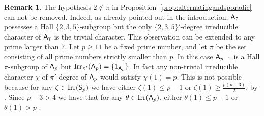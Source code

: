 \documentclass[12pt]{amsart}
\theoremstyle{definition}
\newtheorem{remark}[theorem]{Remark}
\numberwithin{equation}{section}
\newcommand{\Al}{\textup{\textsf{A}}}
\newcommand{\Sy}{\textup{\textsf{S}}}
\begin{document}
\begin{remark}
The %
hypothesis $2\notin \pi$ in
Proposition~\ref{prop:alternatingandsporadic} can not be removed.
Indeed, as already pointed out in the introduction, $\Al_7$
possesses a Hall $\{2,3,5\}$-subgroup %
but the only %
$\{2,3,5\}'$-degree irreducible character of $\Al_7$ is the trivial
character. This observation can %
be extended to any prime larger than
$7$. %
Let $p\geq 11$ be %
a fixed %
prime number, and %
let $\pi$ be the
set consisting of all prime numbers strictly %
smaller than $p$. In %
this case $\Al_{p-1}$ is a Hall $\pi$-subgroup of $\Al_p$ but
$\mathrm{Irr}_{\pi'}(\Al_p)=\{1_{\Al_p}\}$. In fact any non-trivial
irreducible character $\chi$ of $\pi'$-degree of $\Al_p$ would
satisfy $\chi(1)=p$. %
This is not %
possible because for any
$\zeta\in\mathrm{Irr}(\Sy_p)$ we have either $\zeta(1)\leq p-1$ %
or
$\zeta(1)\geq \frac{p(p-3)}{2}$, by %
\cite{Rasala}. Since $p-3> 4$ we
have that for any $\theta\in\mathrm{Irr}(\Al_p)$, either
$\theta(1)\leq p-1$ or $\theta(1)>p$%
.
\end{remark}

\smallskip
\end{document}
